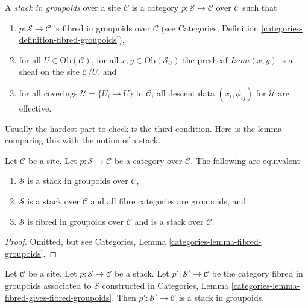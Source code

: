 \begin{definition}
\label{definition-stack-in-groupoids}
A {\it stack in groupoids} over a site $\mathcal{C}$ is a
category $p : \mathcal{S} \to \mathcal{C}$ over $\mathcal{C}$
such that
\begin{enumerate}
\item $p : \mathcal{S} \to \mathcal{C}$ is fibred
in groupoids over $\mathcal{C}$ (see
Categories, Definition \ref{categories-definition-fibred-groupoids}),
\item for all $U \in \text{Ob}(\mathcal{C})$,
for all $x, y\in \text{Ob}(\mathcal{S}_U)$ the presheaf
$\mathit{Isom}(x, y)$ is a sheaf on the site $\mathcal{C}/U$, and
\item for all coverings $\mathcal{U} = \{U_i \to U\}$ in $\mathcal{C}$,
all descent data $(x_i, \phi_{ij})$ for $\mathcal{U}$ are effective.
\end{enumerate}
\end{definition}

\noindent
Usually the hardest part to check is the third condition.
Here is the lemma comparing this with the notion of a stack.

\begin{lemma}
\label{lemma-stack-in-groupoids-stack}
Let $\mathcal{C}$ be a site.
Let $p : \mathcal{S} \to \mathcal{C}$ be a category over $\mathcal{C}$.
The following are equivalent
\begin{enumerate}
\item $\mathcal{S}$ is a stack in groupoids over $\mathcal{C}$,
\item $\mathcal{S}$ is a stack over $\mathcal{C}$ and all
fibre categories are groupoids, and
\item $\mathcal{S}$ is fibred in groupoids over $\mathcal{C}$
and is a stack over $\mathcal{C}$.
\end{enumerate}
\end{lemma}

\begin{proof}
Omitted, but see Categories, Lemma \ref{categories-lemma-fibred-groupoids}.
\end{proof}

\begin{lemma}
\label{lemma-stack-gives-stack-groupoids}
Let $\mathcal{C}$ be a site.
Let $p : \mathcal{S} \to \mathcal{C}$ be a stack.
Let $p' : \mathcal{S}' \to \mathcal{C}$
be the category fibred in groupoids associated to $\mathcal{S}$
constructed in
Categories, Lemma \ref{categories-lemma-fibred-gives-fibred-groupoids}.
Then $p' : \mathcal{S}' \to \mathcal{C}$ is a stack in groupoids.
\end{lemma}


